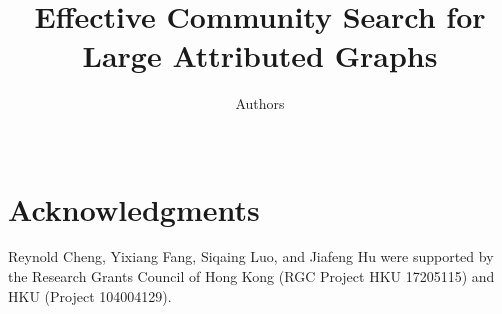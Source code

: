 \documentclass{vldb}
\begin{document}

\title{Effective Community Search for Large Attributed Graphs}
\author{
\alignauthor \text{ } Authors\\
       \\
}

\maketitle
\begin{abstract}

\end{abstract}


















\section*{Acknowledgments}
Reynold Cheng, Yixiang Fang, Siqaing Luo, and Jiafeng Hu were supported by the Research Grants Council of Hong Kong (RGC Project HKU 17205115) and HKU (Project 104004129).


\vspace{0.99em}
\small{}
%

%
%

%
\end{document}
